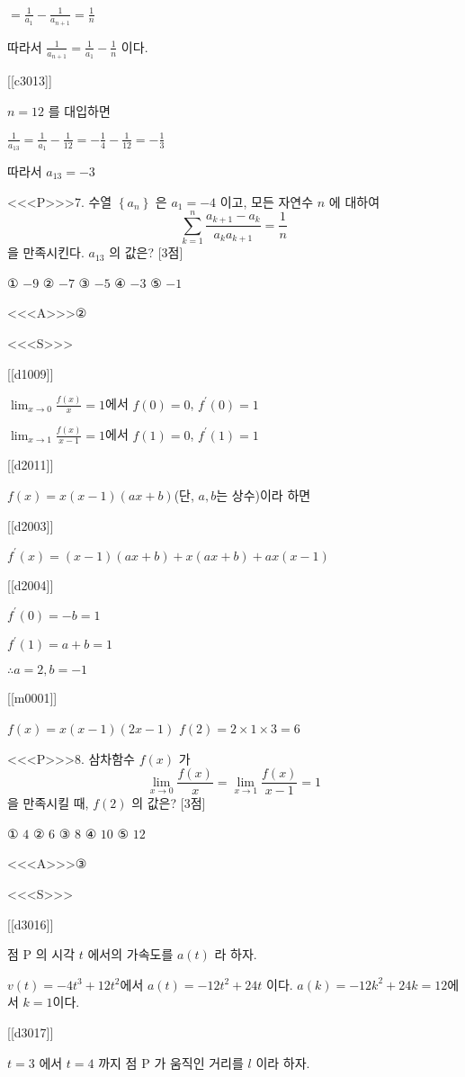 \documentclass{oblivoir}
\begin{document}
$=\frac{1}{a_{1}}-\frac{1}{a_{n+1}}=\frac{1}{n}$

따라서 $\frac{1}{a_{n+1}}=\frac{1}{a_{1}}-\frac{1}{n}$ 이다.

[[c3013]]

$n=12$ 를 대입하면

$\frac{1}{a_{13}}=\frac{1}{a_{1}}-\frac{1}{12}=-\frac{1}{4}-\frac{1}{12}=-\frac{1}{3}$

따라서 $a_{13}=-3$


<<<P>>>7. 수열 $\left\{a_{n}\right\}$ 은 $a_{1}=-4$ 이고, 모든 자연수 $n$ 에 대하여
$$
\sum_{k=1}^{n} \frac{a_{k+1}-a_{k}}{a_{k} a_{k+1}}=\frac{1}{n}
$$
을 만족시킨다. $a_{13}$ 의 값은? [3점]

① $-9$
② $-7$
③ $-5$
④ $-3$
⑤ $-1$

<<<A>>>②

<<<S>>>

[[d1009]]

$\lim _{x \rightarrow 0} \frac{f(x)}{x}=1$에서 $f(0)=0$, $f^{\prime}(0)=1$

$\lim _{x \rightarrow 1} \frac{f(x)}{x-1}=1$에서 $f(1)=0$, $f^{\prime}(1)=1$

[[d2011]]

$f(x)=x(x-1)(a x+b)$(단, $a, b$는 상수)이라 하면

[[d2003]]

$f^{\prime}(x)=(x-1)(a x+b)+x(a x+b)+a x(x-1)$

[[d2004]]

$f^{\prime}(0)=-b=1$

$f^{\prime}(1)=a+b=1$

$\therefore a=2, b=-1$

[[m0001]]

$f(x)=x(x-1)(2 x-1)$
$f(2)=2 \times 1 \times 3=6$


<<<P>>>8. 삼차함수 $f(x)$ 가
$$
\lim _{x \rightarrow 0} \frac{f(x)}{x}=\lim _{x \rightarrow 1} \frac{f(x)}{x-1}=1
$$
을 만족시킬 때, $f(2)$ 의 값은? [3점]

① $4$
② $6$
③ $8$
④ $10$
⑤ $12$

<<<A>>>③

<<<S>>>

[[d3016]]

점 $\mathrm{P}$ 의 시각 $t$ 에서의 가속도를 $a(t)$ 라 하자.

$v(t)=-4 t^{3}+12 t^{2}$에서 $a(t)=-12 t^{2}+24 t $ 이다.
$a(k)=-12 k^{2}+24 k=12$에서 $k=1$이다.

[[d3017]]

$t=3$ 에서 $t=4$ 까지 점 $\mathrm{P}$ 가 움직인 거리를 $l$ 이라 하자.
\end{document}
